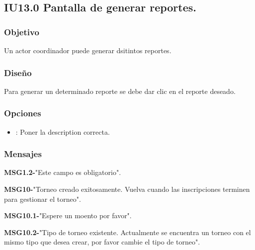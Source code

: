 \subsection{IU13.0 Pantalla de generar reportes.}

\subsubsection{Objetivo}
	Un actor coordinador puede generar dsitintos reportes.

\subsubsection{Diseño}
  Para generar un determinado reporte se debe dar clic en el reporte deseado.


\subsubsection{Opciones}
\begin{itemize}
	\item {}: Poner la description correcta.
\end{itemize}

\subsubsection{Mensajes}
	\begin{Citemize}
		\item {\bf MSG1.2-}"Este campo es obligatorio".
		\item {\bf MSG10-}"Torneo creado exitosamente. Vuelva cuando las inscripciones terminen para gestionar el torneo".
		\item {\bf MSG10.1-}"Espere un moento por favor".
		\item {\bf MSG10.2-}"Tipo de torneo existente. Actualmente se encuentra un torneo con el mismo tipo que desea crear, por favor cambie el tipo de torneo".
\end{Citemize}